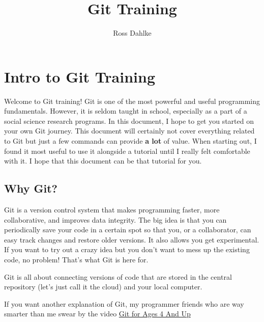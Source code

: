 \documentclass[
  letterpaper,
  DIV=11,
  numbers=noendperiod]{scrartcl}
\title{Git Training}
\author{Ross Dahlke}
\date{}
\renewcommand*\contentsname{Table of contents}
\newcommand\contentsname{Table of contents}
\begin{document}
\maketitle
\ifdefined\Shaded\renewenvironment{Shaded}{\begin{tcolorbox}[boxrule=0pt, interior hidden, enhanced, frame hidden, breakable, sharp corners, borderline west={3pt}{0pt}{shadecolor}]}{\end{tcolorbox}}\fi

\renewcommand*\contentsname{Table of contents}
{
\hypersetup{linkcolor=}
\setcounter{tocdepth}{3}
\tableofcontents
}
\hypertarget{intro-to-git-training}{%
\section{Intro to Git Training}\label{intro-to-git-training}}

Welcome to Git training! Git is one of the most powerful and useful
programming fundamentals. However, it is seldom taught in school,
especially as a part of a social science research programs. In this
document, I hope to get you started on your own Git journey. This
document will certainly not cover everything related to Git but just a
few commands can provide \textbf{a lot} of value. When starting out, I
found it most useful to use it alongside a tutorial until I really felt
comfortable with it. I hope that this document can be that tutorial for
you.

\hypertarget{why-git}{%
\subsection{Why Git?}\label{why-git}}

Git is a version control system that makes programming faster, more
collaborative, and improves data integrity. The big idea is that you can
periodically save your code in a certain spot so that you, or a
collaborator, can easy track changes and restore older versions. It also
allows you get experimental. If you want to try out a crazy idea but you
don't want to mess up the existing code, no problem! That's what Git is
here for.

Git is all about connecting versions of code that are stored in the
central repository (let's just call it the cloud) and your local
computer.

If you want another explanation of Git, my programmer friends who are
way smarter than me swear by the video
\href{https://www.youtube.com/watch?v=1ffBJ4sVUb4\&ab_channel=HackersOnBoard}{Git
for Ages 4 And Up}
\end{document}
